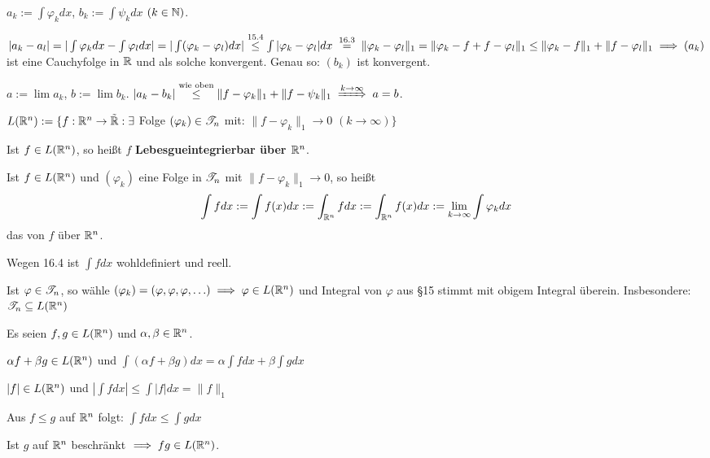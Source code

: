 \documentclass[a4paper,twoside,DIV15,BCOR12mm]{scrbook}
\begin{document}
\begin{beweis}
$a_k := \int \varphi_k dx$, $b_k := \int \psi_k dx$ $(k\in\mathbb{N})$.

$|a_k - a_l| = |\int \varphi_k dx - \int \varphi_l dx | = | \int (\varphi_k - \varphi_l) dx | \stackrel{\text{15.4}}{\le} \int | \varphi_k -\varphi_l| dx \gleichnach{16.3} \|\varphi_k - \varphi_l\|_1 = \|\varphi_k - f+ f -\varphi_l\|_1 \le \|\varphi_k - f\|_1 + \|f - \varphi_l\|_1 \folgt (a_k) $ ist eine Cauchyfolge in $\mathbb{R}$ und als solche konvergent. Genau so: $(b_k)$ ist konvergent.

$a:= \lim a_k$, $b:= \lim b_k$. $|a_k -b_k| \stackrel{\text{wie oben}}\le \|f-\varphi_k\|_1 + \|f-\psi_k\|_1 \folgtwegen{k\to\infty}  a = b$.
\end{beweis}

\begin{definition}
\begin{liste}
\item $L(\mathbb{R}^n) := \{f:\mathbb{R}^n\to\tilde{\mathbb{R}}: \exists$ Folge $(\varphi_k)\in\mathscr{T}_n$ mit: $\|f-\varphi_k\|_1 \to 0$ $(k\to\infty)\}$
\item Ist $f\in L(\mathbb{R}^n)$, so heißt $f$ \textbf{Lebesgueintegrierbar über $\mathbb{R}^n$}.
\item Ist $f\in L(\mathbb{R}^n)$ und $(\varphi_k)$ eine Folge in $\mathscr{T}_n$ mit $\|f-\varphi_k\|_1 \to 0$, so heißt 
$$\int f dx := \int f(x) dx := \int_{\mathbb{R}^n} f dx:= \int_{\mathbb{R}^n}f(x)dx := \lim_{k\to\infty} \int \varphi _k dx$$
das  von $f$ über $\mathbb{R}^n$.
\end{liste}
\end{definition}

\begin{bemerkung}
\begin{liste}
\item Wegen 16.4 ist $\int f dx$ wohldefiniert und reell.
\item Ist $\varphi \in \mathscr{T} _n$, so wähle $(\varphi _k)=(\varphi,\varphi,\varphi,\ldots)\implies \varphi \in L(\mathbb{R}^n)$ und Integral von $\varphi$ aus §15 stimmt mit obigem Integral überein.  Insbesondere: $\mathscr{T}_n \subseteq L(\mathbb{R}^n)$
\end{liste}
\end{bemerkung}

\begin{satz}
Es seien $f,g\in L(\mathbb{R}^n)$ und $\alpha,\beta \in \mathbb{R}^n$.
\begin{liste}
\item $\alpha f + \beta g \in L(\mathbb{R}^n)$ und $\int(\alpha f + \beta g)dx = \alpha \int f dx + \beta \int g d x$
\item $|f| \in L(\mathbb{R}^n)$ und $|\int fdx| \le \int |f| dx  = \|f\|_1$
\item Aus $f\le g $ auf $\mathbb{R}^n$ folgt: $\int f d x \le \int g dx$
\item Ist $g$ auf $\mathbb{R}^n$ beschränkt $\implies f g \in L(\mathbb{R}^n)$.
\end{liste}
\end{satz}
\end{document}
